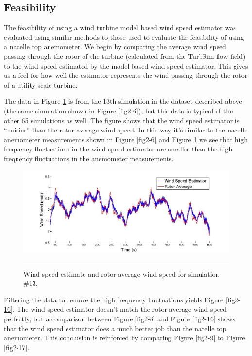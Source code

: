 \subsection{Feasibility} \label{section2-4-1} 

The feasibility of using a wind turbine model based wind speed estimator was evaluated using similar methods to those used to evaluate the feasibility of using a nacelle top anemometer. We begin by comparing the average wind speed passing through the rotor of the turbine (calculated from the TurbSim flow field) to the wind speed estimated by the model based wind speed estimator.  This gives us a feel for how well the estimator represents the wind passing through the rotor of a utility scale turbine.

The data in Figure \ref{fig2-15} is from the 13th simulation in the dataset described above (the same simulation shown in Figure \ref{fig2-6}), but this data is typical of the other 65 simulations as well. The figure shows that the wind speed estimator is “noisier” than the rotor average wind speed. In this way it’s similar to the nacelle anemometer measurements shown in Figure \ref{fig2-6} and Figure \ref{fig2-15} we see that high frequency fluctuations in the wind speed estimator are smaller than the high frequency fluctuations in the anemometer measurements. 

\begin{figure}[htbp]
	\centering
		\includegraphics[trim = {3cm 0 2.5cm 0}, clip, width = \linewidth]{Figures/ch2Figures/fig2-15.jpg}
		\rule{35em}{0.5pt}
	\caption{Wind speed estimate and rotor average wind speed for simulation \#13.}
	\label{fig2-15}
\end{figure}


Filtering the data to remove the high frequency fluctuations yields Figure \ref{fig2-16}. The wind speed estimator doesn’t match the rotor average wind speed perfectly, but a comparison between Figure \ref{fig2-8} and Figure \ref{fig2-16} shows that the wind speed estimator does a much better job than the nacelle top anemometer. This conclusion is reinforced by comparing Figure \ref{fig2-9} to Figure \ref{fig2-17}.

